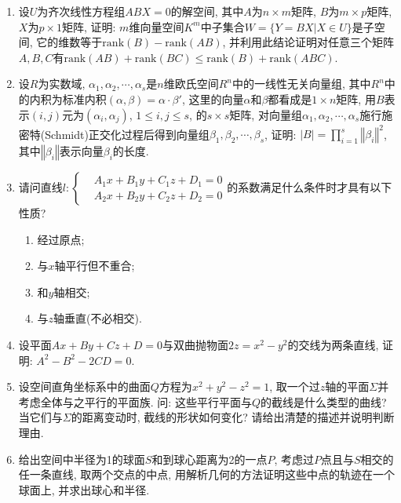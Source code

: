 \documentclass[12pt,a4paper,openany]{book}
\newcommand\num[1]{\left\Vert{#1}\right\Vert}
\begin{document}
\begin{enumerate}
\item 设$U$为齐次线性方程组$ABX = 0$的解空间, 其中$A$为$n \times m$矩阵, $B$为$m \times p$矩阵, $X$为$p \times 1$矩阵, 证明: $m$维向量空间$K^m$中子集合$W = \{ Y = BX | X \in U \}$是子空间, 它的维数等于$\text{rank}(B) - \text{rank}(AB)$, 并利用此结论证明对任意三个矩阵$A, B, C$有$\text{rank}(AB) + \text{rank}(BC) \le \text{rank}(B) + \text{rank}(ABC)$.

\item 设$R$为实数域, $\alpha_1, \alpha_2, \cdots, \alpha_s$是$n$维欧氏空间$R^n$中的一线性无关向量组, 其中$R^n$中的内积为标准内积$(\alpha, \beta) = \alpha\cdot\beta'$, 这里的向量$\alpha$和$\beta$都看成是$1 \times n$矩阵, 用$B$表示$(i, j)$元为$(\alpha_i, \alpha_j)$, $1 \le i, j \le s$, 的$s \times s$矩阵, 对向量组$\alpha_1, \alpha_2, \cdots, \alpha_s$施行施密特(Schmidt)正交化过程后得到向量组$\beta_1, \beta_2, \cdots, \beta_s$, 证明: $|B| = \prod\limits_{i=1}^{s}{\num{\beta_i}^2}$, 其中$\num{\beta_i}$表示向量$\beta_i$的长度.

\item 请问直线$l: \left\{ \begin{aligned} &A_1x + B_1y + C_1z + D_1 = 0 \\ &A_2x + B_2y + C_2z + D_2 = 0 \end{aligned} \right.$的系数满足什么条件时才具有以下性质?
\begin{enumerate}
\item 经过原点;
\item 与$x$轴平行但不重合;
\item 和$y$轴相交;
\item 与$z$轴垂直(不必相交).
\end{enumerate}

\item 设平面$Ax + By + Cz + D =0$与双曲抛物面$2z = x^2 - y^2$的交线为两条直线, 证明: $A^2 - B^2 - 2CD = 0$.

\item 设空间直角坐标系中的曲面$Q$方程为$x^2 + y^2 -z^2 = 1$, 取一个过$z$轴的平面$\Sigma$并考虑全体与之平行的平面族. 问: 这些平行平面与$Q$的截线是什么类型的曲线? 当它们与$\Sigma$的距离变动时, 截线的形状如何变化? 请给出清楚的描述并说明判断理由.

\item 给出空间中半径为1的球面$S$和到球心距离为2的一点$P$, 考虑过$P$点且与$S$相交的任一条直线, 取两个交点的中点, 用解析几何的方法证明这些中点的轨迹在一个球面上, 并求出球心和半径.
\end{enumerate}
\end{document}
